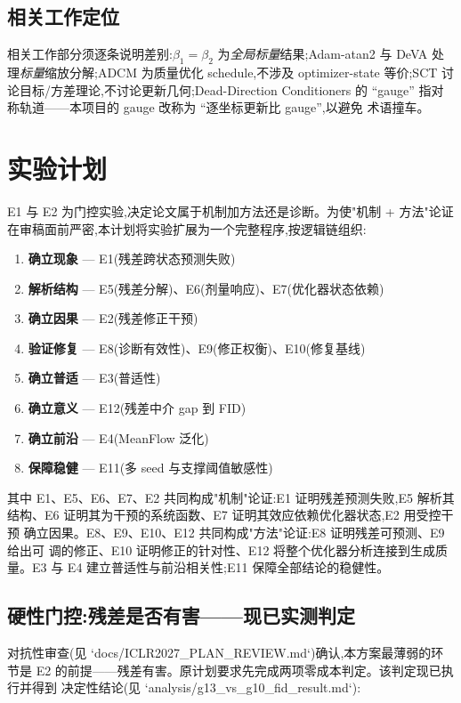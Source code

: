 \documentclass[UTF8,11pt,a4paper]{ctexart}
\begin{document}
\subsection{相关工作定位}
相关工作部分须逐条说明差别:$\beta_1{=}\beta_2$ 为\emph{全局标量}结果;Adam-atan2
与 DeVA 处理\emph{标量}缩放分解;ADCM 为质量优化 schedule,不涉及 optimizer-state
等价;SCT 讨论目标/方差理论,不讨论更新几何;Dead-Direction Conditioners 的
``gauge'' 指对称轨道——本项目的 gauge 改称为 ``逐坐标更新比 gauge'',以避免
术语撞车。

\section{实验计划}
\label{sec:experiments}

E1 与 E2 为门控实验,决定论文属于机制加方法还是诊断。为使"机制 + 方法"论证
在审稿面前严密,本计划将实验扩展为一个完整程序,按逻辑链组织:

\begin{enumerate}[leftmargin=*,itemsep=1pt,label=\textbf{\arabic*.}]
  \item \textbf{确立现象} --- E1(残差跨状态预测失败)
  \item \textbf{解析结构} --- E5(残差分解)、E6(剂量响应)、E7(优化器状态依赖)
  \item \textbf{确立因果} --- E2(残差修正干预)
  \item \textbf{验证修复} --- E8(诊断有效性)、E9(修正权衡)、E10(修复基线)
  \item \textbf{确立普适} --- E3(普适性)
  \item \textbf{确立意义} --- E12(残差中介 gap 到 FID)
  \item \textbf{确立前沿} --- E4(MeanFlow 泛化)
  \item \textbf{保障稳健} --- E11(多 seed 与支撑阈值敏感性)
\end{enumerate}

其中 E1、E5、E6、E7、E2 共同构成"机制"论证:E1 证明残差预测失败,E5 解析其
结构、E6 证明其为干预的系统函数、E7 证明其效应依赖优化器状态,E2 用受控干预
确立因果。E8、E9、E10、E12 共同构成"方法"论证:E8 证明残差可预测、E9 给出可
调的修正、E10 证明修正的针对性、E12 将整个优化器分析连接到生成质量。E3 与
E4 建立普适性与前沿相关性;E11 保障全部结论的稳健性。

\subsection{硬性门控:残差是否有害——现已实测判定}
对抗性审查(见 `docs/ICLR2027\_PLAN\_REVIEW.md`)确认,本方案最薄弱的环节是
E2 的前提——残差有害。原计划要求先完成两项零成本判定。该判定现已执行并得到
决定性结论(见 `analysis/g13\_vs\_g10\_fid\_result.md`):
\end{document}
